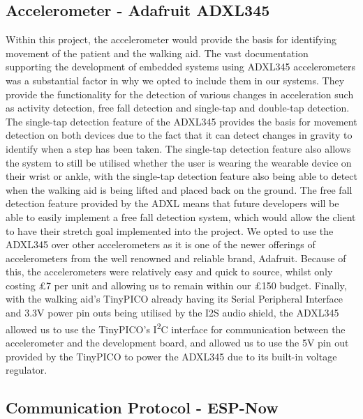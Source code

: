         \subsection{Accelerometer - Adafruit ADXL345}
        \label{subsec:accel}

            Within this project, the accelerometer would provide the basis for identifying movement of the patient and the walking aid. The vast documentation supporting the development of embedded systems using ADXL345 accelerometers was a substantial factor in why we opted to include them in our systems. They provide the functionality for the detection of various changes in acceleration such as activity detection, free fall detection and single-tap and double-tap detection. The single-tap detection feature of the ADXL345 provides the basis for movement detection on both devices due to the fact that it can detect changes in gravity to identify when a step has been taken. The single-tap detection feature also allows the system to still be utilised whether the user is wearing the wearable device on their wrist or ankle, with the single-tap detection feature also being able to detect when the walking aid is being lifted and placed back on the ground. The free fall detection feature provided by the ADXL means that future developers will be able to easily implement a free fall detection system, which would allow the client to have their stretch goal implemented into the project. We opted to use the ADXL345 over other accelerometers as it is one of the newer offerings of accelerometers from the well renowned and reliable brand, Adafruit. Because of this, the accelerometers were relatively easy and quick to source, whilst only costing £7 per unit and allowing us to remain within our £150 budget. Finally, with the walking aid's TinyPICO already having its Serial Peripheral Interface and 3.3V power pin outs being utilised by the I2S audio shield, the ADXL345 allowed us to use the TinyPICO's I\textsuperscript{2}C interface for communication between the accelerometer and the development board, and allowed us to use the 5V pin out provided by the TinyPICO to power the ADXL345 due to its built-in voltage regulator.

        \subsection{Communication Protocol - ESP-Now}
        \label{subsec:esp_now_comms}

